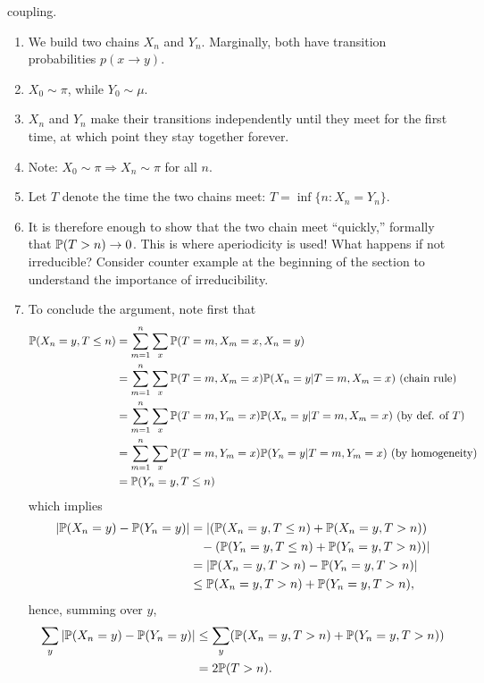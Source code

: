 \documentclass{article}
\begin{document}
 coupling.  
\begin{enumerate}
  \item We build two chains $X_n$ and $Y_n$. Marginally, both have transition probabilities $p(x \to y)$.
  \item $X_0 \sim \pi$, while $Y_0 \sim \mu$. 
  \item $X_n$ and $Y_n$ make their transitions independently until they meet for the first time, at which point they stay together forever.
  \item Note: $X_0 \sim \pi \Rightarrow X_n \sim \pi$ for all $n$. 
  \item Let $T$ denote the time the two chains meet: $T = \inf\{n : X_n = Y_n\}$.
  \item It is therefore enough to show that the two chain meet ``quickly,'' formally that $\P(T > n) \to 0$. This is where aperiodicity is used! What happens if not irreducible? Consider counter example at the beginning of the section to understand the importance of irreducibility.
  \item To conclude the argument, note first that
  \begin{align*}
  	\P(X_n = y, T \le n) &= \sum_{m=1}^n \sum_x \P(T=m, X_m = x, X_n = y) \\
  	&= \sum_{m=1}^n \sum_x \P(T=m, X_m = x) \P(X_n = y | T=m, X_m = x) \text{ (chain rule)} \\ &= \sum_{m=1}^n \sum_x \P(T=m, Y_m = x) \P(X_n = y | T=m, X_m = x) \text{ (by def. of $T$)}\\
  	&= \sum_{m=1}^n \sum_x \P(T=m, Y_m = x) \P(Y_n = y | T=m, Y_m = x) \text{ (by homogeneity)} \\
  	&= \P(Y_n = y, T \le n)\\
  \end{align*}
  which implies
  \begin{align*}
  	| \P(X_n = y) - \P(Y_n = y) | &= |(\P(X_n = y, T \le n) + \P(X_n = y, T > n)) \\&\;\;\;- (\P(Y_n = y, T \le n) + \P(Y_n = y, T > n))| \\
  	&= |\P(X_n = y, T > n) - \P(Y_n = y, T > n)| \\
  	&\le \P(X_n = y, T > n) + \P(Y_n = y, T > n),
  \end{align*}
  hence, summing over $y$, 
  \begin{align*}
  \sum_y	| \P(X_n = y) - \P(Y_n = y) | &\le \sum_y ( \P(X_n = y, T > n) + \P(Y_n = y, T > n)) \\
  &= 2\P(T > n).
  \end{align*}
\end{enumerate}
\end{document}

